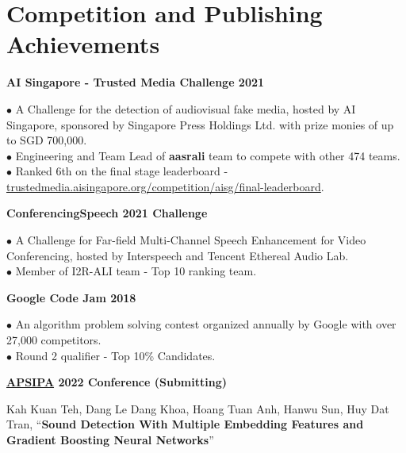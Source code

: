 \documentclass[10pt]{article}
\begin{document}
    \section{Competition and Publishing Achievements}
        \begin{flushleft}
            \textbf{AI Singapore - Trusted Media Challenge 2021}
        \end{flushleft}
        \vspace{-1.5mm}
        $\bullet$ A Challenge for the detection of audiovisual fake media, hosted by AI Singapore, sponsored by Singapore Press Holdings Ltd. with prize monies of up to SGD 700,000. \\
        $\bullet$ Engineering and Team Lead of \textbf{aasrali} team to compete with other 474 teams. \\
        $\bullet$ Ranked 6th on the final stage leaderboard - \href{https://trustedmedia.aisingapore.org/competition/aisg/final-leaderboard/}{trustedmedia.aisingapore.org/competition/aisg/final-leaderboard}. \\

        \begin{flushleft}
            \textbf{ConferencingSpeech 2021 Challenge}
        \end{flushleft}
        \vspace{-1.5mm}
        $\bullet$ A Challenge for Far-field Multi-Channel Speech Enhancement for Video Conferencing, hosted by Interspeech and Tencent Ethereal Audio Lab. \\
        $\bullet$ Member of I2R-ALI team - Top 10 ranking team. \\

        \begin{flushleft}
            \textbf{Google Code Jam 2018}
        \end{flushleft}
        \vspace{-1.5mm}
        $\bullet$ An algorithm problem solving contest organized annually by Google with over 27,000 competitors. \\
        $\bullet$ Round 2 qualifier - Top 10\% Candidates. \\

        \begin{flushleft}
            \textbf{\href{https://www.apsipa2022.org/}{APSIPA} 2022 Conference (Submitting)}
        \end{flushleft}
        \vspace{-1.5mm}
        Kah Kuan Teh, Dang Le Dang Khoa, Hoang Tuan Anh, Hanwu Sun, Huy Dat Tran, “\textbf{Sound Detection With Multiple Embedding Features and Gradient Boosting Neural Networks}”
\end{document}
